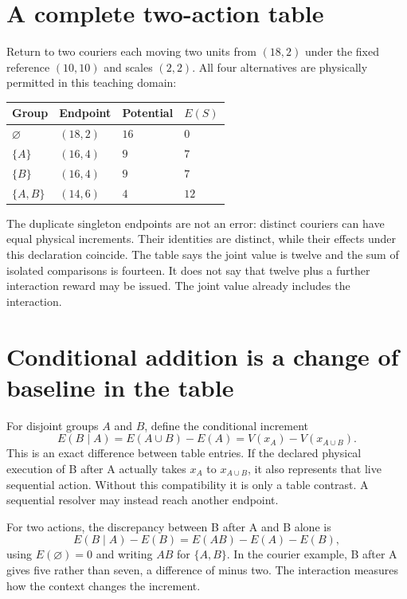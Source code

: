 \section{A complete two-action table}
Return to two couriers each moving two units from $(18,2)$ under the fixed reference $(10,10)$ and scales $(2,2)$. All four alternatives are physically permitted in this teaching domain:
\begin{center}
\begin{tabular}{llll}\toprule
Group & Endpoint & Potential & $E(S)$\\\midrule
$\varnothing$ & $(18,2)$ & $16$ & $0$\\
$\{A\}$ & $(16,4)$ & $9$ & $7$\\
$\{B\}$ & $(16,4)$ & $9$ & $7$\\
$\{A,B\}$ & $(14,6)$ & $4$ & $12$\\\bottomrule
\end{tabular}
\end{center}
The duplicate singleton endpoints are not an error: distinct couriers can have equal physical increments. Their identities are distinct, while their effects under this declaration coincide. The table says the joint value is twelve and the sum of isolated comparisons is fourteen. It does not say that twelve plus a further interaction reward may be issued. The joint value already includes the interaction.

\section{Conditional addition is a change of baseline in the table}
For disjoint groups $A$ and $B$, define the conditional increment
\begin{equation}
 E(B\mid A)=E(A\cup B)-E(A)
          =V(x_A)-V(x_{A\cup B}).
\end{equation}
This is an exact difference between table entries. If the declared physical execution of B after A actually takes $x_A$ to $x_{A\cup B}$, it also represents that live sequential action. Without this compatibility it is only a table contrast. A sequential resolver may instead reach another endpoint.

For two actions, the discrepancy between B after A and B alone is
\begin{equation}\label{eq:pair-conditional}
 E(B\mid A)-E(B)=E(AB)-E(A)-E(B),
\end{equation}
using $E(\varnothing)=0$ and writing $AB$ for $\{A,B\}$. In the courier example, B after A gives five rather than seven, a difference of minus two. The interaction measures how the context changes the increment.

